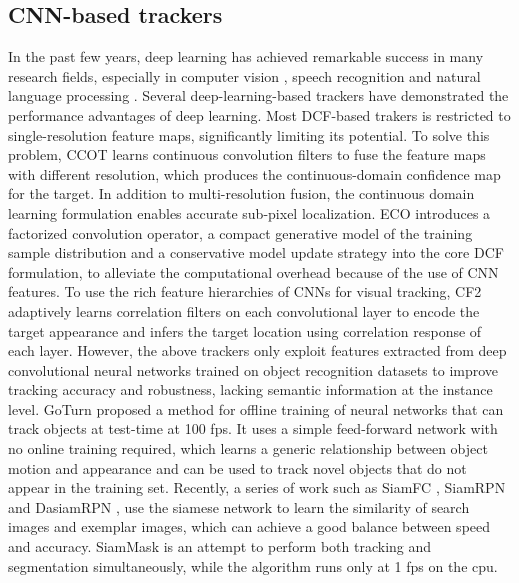 \documentclass[review]{elsarticle}
\begin{document}
\begin{CJK*}{UTF8}{gbsn}
\subsection{CNN-based trackers}
In the past few years, deep learning \cite{Goodfellow2015DeepL} has achieved remarkable success in many research fields, especially in computer vision \cite{Girshick2016RegionBasedCN, Schroff2015FaceNetAU}, speech recognition \cite{Kim2016JointCB, Wu2015DeepNN} and natural language processing \cite{Vinyals2014GrammarAA, Bahdanau2014NeuralMT}. Several deep-learning-based trackers have demonstrated the performance advantages of deep learning. 
Most DCF-based trakers is restricted to single-resolution feature maps, significantly limiting its potential. To solve this problem, CCOT \cite{Danelljan2016BeyondCF} learns continuous convolution filters to fuse the feature maps with different resolution, which produces the continuous-domain confidence map for the target. In addition to multi-resolution fusion, the continuous domain learning formulation enables accurate sub-pixel localization.
ECO \cite{Danelljan2016ECOEC} introduces a factorized convolution operator, 
a compact generative model of the training sample distribution and a conservative model  update strategy into the core DCF formulation, to alleviate the computational overhead because of the use of CNN features.
To use the rich feature hierarchies of CNNs for visual tracking, CF2 \cite{Ma2015HierarchicalCF} adaptively learns correlation filters on each convolutional layer to encode the target appearance and infers the target location using correlation response of each layer.
However, the above trackers only exploit features extracted from deep convolutional neural networks trained on object recognition datasets to improve tracking accuracy and robustness, lacking semantic information at the instance level.
GoTurn \cite{held2016learning} proposed a method for offline training of neural networks that can track objects at test-time at 100 fps. It uses a simple feed-forward network with no online training required, which learns a generic relationship between object motion and appearance and can be used to track novel objects that do not appear in the training set. 
Recently, a series of work such as SiamFC \cite{bertinetto2016fully}, SiamRPN \cite{Li2018HighPV} and DasiamRPN \cite{zhu2018distractor}, use the siamese network to learn the similarity of search images and exemplar images, which can achieve a good balance between speed and accuracy. 
SiamMask \cite{Wang2018SiamMask} is an attempt to perform both tracking and segmentation simultaneously, while the algorithm runs only at 1 fps on the cpu.

\end{CJK*}
\end{document}
